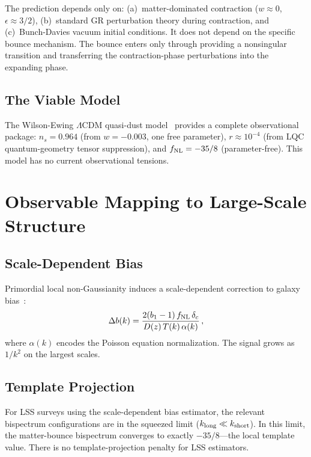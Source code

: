 \documentclass[a4paper,11pt]{article}
\newcommand{\fnl}{f_{\rm NL}}
\begin{document}
The prediction depends only on: (a)~matter-dominated contraction ($w \approx 0$, $\epsilon \approx 3/2$), (b)~standard GR perturbation theory during contraction, and (c)~Bunch-Davies vacuum initial conditions. It does not depend on the specific bounce mechanism. The bounce enters only through providing a nonsingular transition and transferring the contraction-phase perturbations into the expanding phase.

\subsection{The Viable Model}

The Wilson-Ewing $\Lambda$CDM quasi-dust model~\citep{WilsonEwing:2012} provides a complete observational package: $n_s = 0.964$ (from $w = -0.003$, one free parameter), $r \approx 10^{-4}$ (from LQC quantum-geometry tensor suppression), and $\fnl = -35/8$ (parameter-free). This model has no current observational tensions.

\section{Observable Mapping to Large-Scale Structure}
\label{sec:lss}

\subsection{Scale-Dependent Bias}

Primordial local non-Gaussianity induces a scale-dependent correction to galaxy bias~\citep{Dalal:2007cu}:
\begin{equation}
\Delta b(k) = \frac{2(b_1 - 1)\, \fnl\, \delta_c}{D(z)\, T(k)\, \alpha(k)}\,,
\end{equation}
where $\alpha(k)$ encodes the Poisson equation normalization. The signal grows as $1/k^2$ on the largest scales.

\subsection{Template Projection}

For LSS surveys using the scale-dependent bias estimator, the relevant bispectrum configurations are in the squeezed limit ($k_{\rm long} \ll k_{\rm short}$). In this limit, the matter-bounce bispectrum converges to exactly $-35/8$---the local template value. There is no template-projection penalty for LSS estimators.
\end{document}
